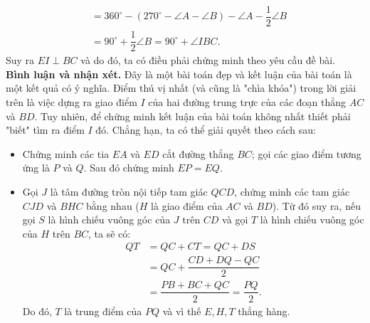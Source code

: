 \begin{bt}
{\begin{align*}
		& = 360^\circ -(270^\circ -\angle A - \angle B) -\angle A -\dfrac{1}{2} \angle B \\
		& = 90^\circ +\dfrac{1}{2} \angle B =90^\circ  + \angle IBC.
		\end{align*}
		Suy ra $EI \perp BC$ và do đó, ta có điều phải chứng minh theo yêu cầu đề bài. \\
		\textbf{Bình luận và nhận xét.} 
		Đây là một bài toán đẹp và kết luận của bài toán là một kết quả có ý nghĩa. Điểm thú vị nhất (và cũng là "chìa khóa") trong lời giải trên là việc dựng ra giao điểm $I$ của hai đường trung trực của các đoạn thẳng $AC$ và $BD$. Tuy nhiên, để chứng minh kết luận của bài toán không nhất thiết phải "biết" tìm ra điểm $I$ đó. Chẳng hạn, ta có thể giải quyết theo cách sau: 
	\begin{itemize}
		\item  Chứng minh các tia $EA$ và $ED$ cắt đường thẳng $BC$; gọi các giao điểm tương ứng là $P$ và $Q$. Sau đó chứng minh $EP=EQ$. 
		\item Gọi $J$ là tâm đường tròn nội tiếp tam giác $QCD$, chứng minh các tam giác $CJD$  và $BHC$ bằng nhau ($H$ là giao điểm của $AC$ và $BD$). Từ đó suy ra, nếu gọi $S$ là hình chiếu vuông góc của $J$ trên $CD$ và gọi $T$ là hình chiếu vuông góc của $H$ trên $BC$, ta sẽ có: 
		\begin{align*}
		QT&=QC+CT=QC+DS\\
		&=QC+\dfrac{CD+DQ-QC}{2}\\
		&=\dfrac{PB+BC+QC}{2}=\dfrac{PQ}{2}.
		\end{align*}
		Do đó, $T$ là trung điểm của $PQ$ và vì thế $E,H,T$ thẳng hàng.
	\end{itemize}
	}
\end{bt}
